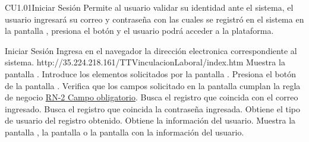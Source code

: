 

\begin{UseCase}{CU1.01}{Iniciar Sesión}{
	Permite al usuario validar su identidad ante el sistema, el usuario ingresará su correo y contraseña con las cuales se registró en el sistema en la pantalla , presiona el botón  y el usuario podrá acceder a la plataforma.
\bigskip
}

		
	\end{UseCase}
	\begin{UCtrayectoria}{Iniciar Sesión}
	    \UCpaso[\UCactor] Ingresa en el navegador la dirección electronica correspondiente al sistema. http://35.224.218.161/TTVinculacionLaboral/index.htm
	    \UCpaso[\UCsist] Muestra la pantalla .
		\UCpaso[\UCactor] Introduce los elementos solicitados por la pantalla .
		\UCpaso[\UCactor] Presiona el botón  de la pantalla . 
		\UCpaso[\UCsist] Verifica que los campos solicitado en la pantalla  cumplan la regla de negocio \hyperlink{RN2}{RN-2 Campo obligatorio}. 
		\UCpaso[\UCsist] Busca el registro que coincida con el correo ingresado. 
		\UCpaso[\UCsist] Busca el registro que coincida la contraseña ingresada. 
		\UCpaso[\UCsist] Obtiene el tipo de usuario del registro obtenido.
		\UCpaso[\UCsist] Obtiene la información del usuario.
		\UCpaso[\UCsist] Muestra la pantalla , la pantalla  o la pantalla  con la información del usuario.
	\end{UCtrayectoria}

